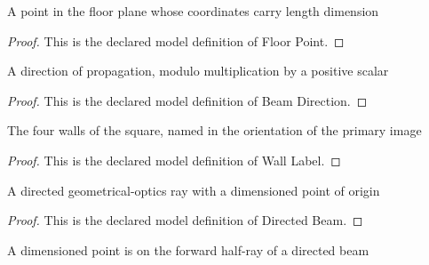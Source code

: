 \begin{definition}
  \label{def:physics:phyx-mini-0025:phyxminiproblems-problemphyxmini0025-floorpoint}
  A point in the floor plane whose coordinates carry length dimension
\end{definition}
\begin{proof}
  This is the declared model definition of Floor Point.
\end{proof}
\begin{definition}
  \label{def:physics:phyx-mini-0025:phyxminiproblems-problemphyxmini0025-beamdirection}
  A direction of propagation, modulo multiplication by a positive scalar
\end{definition}
\begin{proof}
  This is the declared model definition of Beam Direction.
\end{proof}
\begin{definition}
  \label{def:physics:phyx-mini-0025:phyxminiproblems-problemphyxmini0025-walllabel}
  The four walls of the square, named in the orientation of the primary image
\end{definition}
\begin{proof}
  This is the declared model definition of Wall Label.
\end{proof}
\begin{definition}
  \label{def:physics:phyx-mini-0025:phyxminiproblems-problemphyxmini0025-directedbeam}
  A directed geometrical-optics ray with a dimensioned point of origin
\end{definition}
\begin{proof}
  This is the declared model definition of Directed Beam.
\end{proof}
\begin{definition}
  \label{def:physics:phyx-mini-0025:phyxminiproblems-problemphyxmini0025-pointonbeam}
  A dimensioned point is on the forward half-ray of a directed beam
\end{definition}
